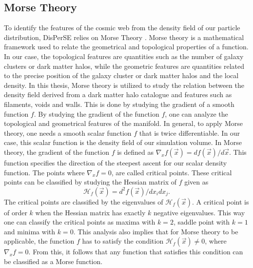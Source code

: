 \subsection{Morse Theory}
To identify the features of the cosmic web from the density field of our
particle distribution, DisPerSE relies on Morse Theory \cite{Morse}. Morse
theory is a mathematical framework used to relate the geometrical and
topological properties of a function. In our case, the topological features are quantities such as the number of galaxy clusters or dark matter halos, while the geometric features are quantities related to the precise position of the galaxy cluster or dark matter halos and the local density. In this thesis, Morse theory is utilized to
study the relation between the density field derived from a dark matter halo catalogue and features such as
filaments, voids and walls.
This is done by studying the gradient of a smooth function $f$. By studying the
gradient of the function $f$, one can analyze the topological and geometrical features of
the manifold. In general, to apply Morse theory, one needs a smooth scalar function $f$
that is twice differentiable. In our case, this scalar function is the density
field of our simulation volume. In Morse theory, the gradient of the function $f$
is defined as $\nabla_xf(\vec{x})=df(\vec{x})/d\vec{x}$. This function
specifies the direction of the steepest ascent for our scalar density function. The
points where $\nabla_xf=0$, are called critical points. These critical
points can be classified by studying the Hessian matrix of $f$ given as
\begin{equation}
    \mathcal{H}_f(\vec{x})=d^2f(\vec{x})/dx_idx_j.
\end{equation}
The critical points are classified by the eigenvalues of $\mathcal{H}_f(\vec{x})$. A critical point is of order $k$ when the Hessian matrix has exactly $k$
negative eigenvalues. This way one can classify the critical points as maxima
with $k=2$, saddle point with $k=1$ and minima with $k=0$. This analysis also
implies that for Morse theory to be applicable, the function $f$ has to satisfy
the condition $\mathcal{H}_f(\vec{x})\neq 0$, where $\nabla_xf=0$. From this, it
follows that any function that satisfies this condition can be classified as a Morse
function.\\
 
